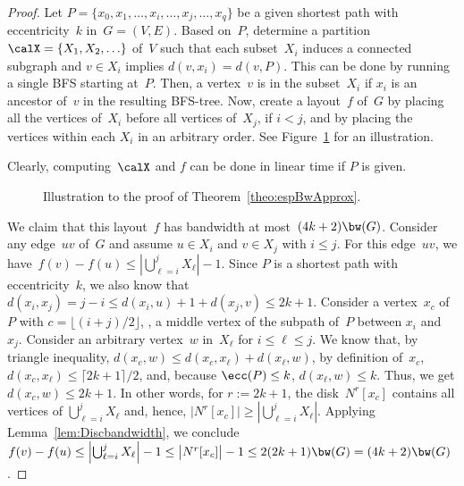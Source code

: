 \begin{proof}
Let $P = \{ x_0, x_1, \ldots, x_i, \ldots, x_j, \ldots, x_q \}$ be a given shortest path with eccentricity~$k$ in~$G = (V, E)$.
Based on~$P$, determine a partition~$\calX = \{ X_1, X_2, \ldots \}$ of~$V$ such that each subset~$X_i$ induces a connected subgraph and $v \in X_i$ implies $d(v, x_i) = d(v, P)$.
This can be done by running a single BFS starting at~$P$.
Then, a vertex~$v$ is in the subset~$X_i$ if $x_i$ is an ancestor of~$v$ in the resulting BFS-tree.
Now, create a layout~$f$ of~$G$ by placing all the vertices of~$X_i$ before all vertices of~$X_j$, if $i < j$, and by placing the vertices within each $X_i$ in an arbitrary order.
See Figure~\ref{fig:bwld_bwApprox} for an illustration.

Clearly, computing~$\calX$ and $f$ can be done in linear time if $P$ is given.

\begin{figure}
    [htb]
    \centering
    
    \caption
    {%
        Illustration to the proof of Theorem~\ref{theo:espBwApprox}.
    }
    \label{fig:bwld_bwApprox}
\end{figure}

We claim that this layout~$f$ has bandwidth at most~$(4k + 2) \bw(G)$.
Consider any edge~$uv$ of~$G$ and assume $u \in X_i$ and $v \in X_j$ with $i \leq j$.
For this edge~$uv$, we have~$f(v) - f(u) \leq \left | \bigcup_{\ell = i}^j X_\ell \right | - 1$.
Since $P$ is a shortest path with eccentricity~$k$, we also know that $d(x_i, x_j) = j - i \leq d(x_i, u) + 1 + d(x_j, v) \leq 2k + 1$.
Consider a vertex~$x_c$ of~$P$ with $c = \big \lfloor (i + j) / 2 \big \rfloor$, \ie, a middle vertex of the subpath of~$P$ between $x_i$ and~$x_j$.
Consider an arbitrary vertex~$w$ in~$X_{\ell}$ for $i \leq \ell \leq j$.
We know that, by triangle inequality, $d(x_c, w) \leq d(x_c, x_\ell) + d(x_\ell, w)$, by definition of~$x_c$, $d(x_c, x_\ell) \leq \lceil 2k + 1 \rceil / 2$, and, because $\ecc(P) \leq k$, $d(x_\ell, w) \leq k$.
Thus, we get $d(x_c, w) \leq 2k + 1$.
In other words, for $r := 2k + 1$, the disk~$N^r[x_c]$ contains all vertices of $\bigcup_{\ell = i}^j X_{\ell}$ and, hence, $\big| N^r[x_c] \big| \geq \left| \bigcup_{\ell = i}^j X_{\ell} \right|$.
Applying Lemma~\ref{lem:Discbandwidth}, we conclude $f(v) - f(u) \leq \left | \bigcup_{\ell = i}^j X_{\ell} \right | - 1 \leq \big| N^r[x_c] \big| - 1 \leq 2 (2k + 1) \bw(G) = (4k + 2) \bw(G)$.
\end{proof}

